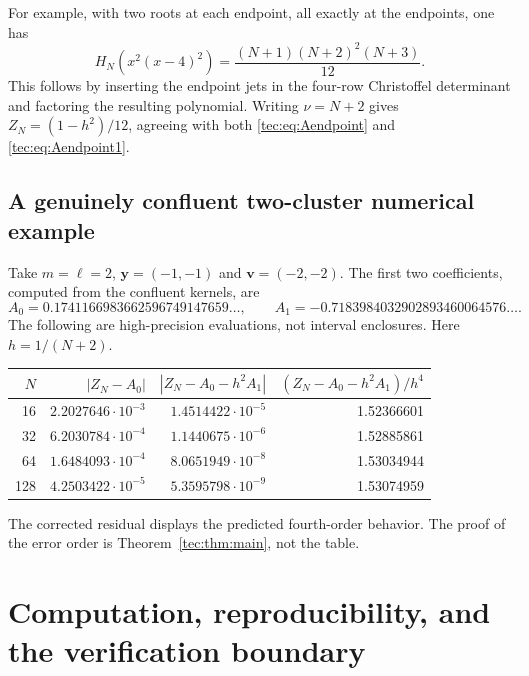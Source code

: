 \documentclass[11pt,a4paper]{article}
\numberwithin{equation}{section}
\theoremstyle{definition}
\theoremstyle{remark}
\newcommand{\by}{\boldsymbol{y}}
\newcommand{\bv}{\boldsymbol v}
\begin{document}
For example, with two roots at each endpoint, all exactly at the
endpoints, one has
\begin{equation}\label{tec:eq:22exact}
 H_N(x^2(x-4)^2)=\frac{(N+1)(N+2)^2(N+3)}{12}.
\end{equation}
This follows by inserting the endpoint jets in the four-row
Christoffel determinant and factoring the resulting polynomial.
Writing $\nu=N+2$ gives
$Z_N=(1-h^2)/12$, agreeing with both
\eqref{tec:eq:Aendpoint} and \eqref{tec:eq:Aendpoint1}.

\subsection{A genuinely confluent two-cluster numerical example}
Take $m=\ell=2$, $\by=(-1,-1)$ and $\bv=(-2,-2)$.
The first two coefficients, computed from the confluent kernels, are
\[
 A_0=0.1741166983662596749147659\ldots,\qquad
 A_1=-0.7183984032902893460064576\ldots.
\]
The following are high-precision evaluations, not interval enclosures.
Here $h=1/(N+2)$.
\begin{center}\small
\begin{tabular}{@{}rrrr@{}}\toprule
$N$ & $|Z_N-A_0|$ & $|Z_N-A_0-h^2A_1|$ &
 $(Z_N-A_0-h^2A_1)/h^4$\\\midrule
16 & $2.2027646\cdot10^{-3}$ & $1.4514422\cdot10^{-5}$ & 1.52366601\\
32 & $6.2030784\cdot10^{-4}$ & $1.1440675\cdot10^{-6}$ & 1.52885861\\
64 & $1.6484093\cdot10^{-4}$ & $8.0651949\cdot10^{-8}$ & 1.53034944\\
128 & $4.2503422\cdot10^{-5}$ & $5.3595798\cdot10^{-9}$ & 1.53074959\\
\bottomrule\end{tabular}
\end{center}
The corrected residual displays the predicted fourth-order behavior.
The proof of the error order is Theorem~\ref{tec:thm:main}, not the table.

\section{Computation, reproducibility, and the verification boundary}\label{tec:sec:verification}
\end{document}
